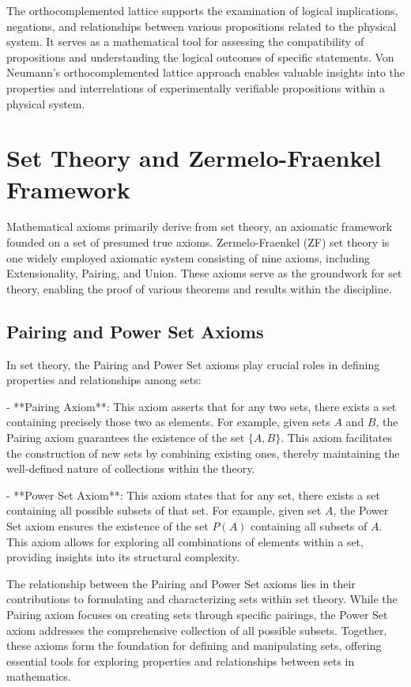 \documentclass{article}
\begin{document}
The orthocomplemented lattice supports the examination of logical implications, negations, and relationships between various propositions related to the physical system. It serves as a mathematical tool for assessing the compatibility of propositions and understanding the logical outcomes of specific statements. Von Neumann's orthocomplemented lattice approach enables valuable insights into the properties and interrelations of experimentally verifiable propositions within a physical system.

\section{Set Theory and Zermelo-Fraenkel Framework}

Mathematical axioms primarily derive from set theory, an axiomatic framework founded on a set of presumed true axioms. Zermelo-Fraenkel (ZF) set theory is one widely employed axiomatic system consisting of nine axioms, including Extensionality, Pairing, and Union. These axioms serve as the groundwork for set theory, enabling the proof of various theorems and results within the discipline.

\subsection{Pairing and Power Set Axioms}

In set theory, the Pairing and Power Set axioms play crucial roles in defining properties and relationships among sets:

- **Pairing Axiom**: This axiom asserts that for any two sets, there exists a set containing precisely those two as elements. For example, given sets \(A\) and \(B\), the Pairing axiom guarantees the existence of the set \(\{A, B\}\). This axiom facilitates the construction of new sets by combining existing ones, thereby maintaining the well-defined nature of collections within the theory.

- **Power Set Axiom**: This axiom states that for any set, there exists a set containing all possible subsets of that set. For example, given set \(A\), the Power Set axiom ensures the existence of the set \(P(A)\) containing all subsets of \(A\). This axiom allows for exploring all combinations of elements within a set, providing insights into its structural complexity.

The relationship between the Pairing and Power Set axioms lies in their contributions to formulating and characterizing sets within set theory. While the Pairing axiom focuses on creating sets through specific pairings, the Power Set axiom addresses the comprehensive collection of all possible subsets. Together, these axioms form the foundation for defining and manipulating sets, offering essential tools for exploring properties and relationships between sets in mathematics.
\end{document}
